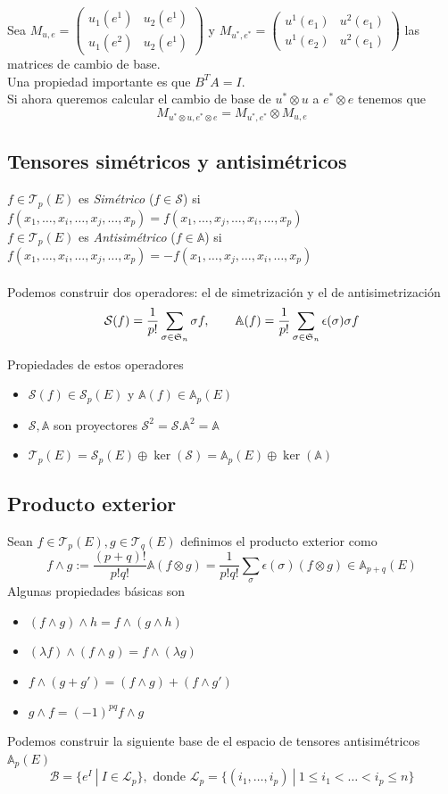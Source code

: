 \documentclass{myclass}
\newcommand{\T}{\mathcal{T}}
\newcommand{\A}{\mathcal{A}}
\renewcommand{\S}{\mathcal{S}}
\newcommand{\st}{\ | \ }
\renewcommand{\A}{\mathbb{A}}
\begin{document}
Sea $M_{u, e} = \begin{pmatrix}
u_1(e^1) & u_2(e^1) \\
u_1(e^2) & u_2(e^1)
\end{pmatrix}$ y $M_{u^*, e^*} = \begin{pmatrix}
u^1(e_1) & u^2(e_1) \\
u^1(e_2) & u^2(e_1)
\end{pmatrix}$ las matrices de cambio de base.\\
Una propiedad importante es que $B^TA = I$.
\\
Si ahora queremos calcular el cambio de base de $u^*\otimes u$ a $e^*\otimes e$ tenemos que
$$
M_{u^*\otimes u, e^*\otimes e} = M_{u^*, e^*}\otimes M_{u,e}
$$

\subsection{Tensores simétricos y antisimétricos}
$f\in\T_p(E)$ es \textit{Simétrico} ($f\in \S$) si $f(x_1, \ldots, x_i, \ldots, x_j, \ldots, x_p) = f(x_1, \ldots, x_j, \ldots, x_i, \ldots, x_p)$ \\
$f\in\T_p(E)$ es \textit{Antisimétrico} ($f\in \A$) si $f(x_1, \ldots, x_i, \ldots, x_j, \ldots, x_p) = -f(x_1, \ldots, x_j, \ldots, x_i, \ldots, x_p)$ \\
\\
Podemos construir dos operadores: el de simetrización y el de antisimetrización
$$
\S(f) = \frac{1}{p!} \sum_{\sigma \in \frak{S}_n} \sigma f, \qquad \A(f) = \frac{1}{p!} \sum_{\sigma \in \frak{S}_n} \epsilon(\sigma)\sigma f
$$

Propiedades de estos operadores
\begin{itemize}
    \item $\S(f)\in \S_p(E)$ y $\A(f)\in \A_p(E)$
    \item $\S, \A$ son proyectores $\S^2=\S. \A^2=\A$
    \item $\T_p(E)=\S_p(E)\oplus \ker(\S) = \A_p(E)\oplus \ker(\A)$
\end{itemize}

\subsection{Producto exterior}
Sean $f\in\T_p(E), g\in \T_q(E) $ definimos el producto exterior como
$$
f\wedge g := \frac{(p+q)!}{p!q!}\A(f\otimes g) = \frac{1}{p!q!}\sum_\sigma \epsilon(\sigma)(f\otimes g) \in \A_{p+q}(E)
$$
Algunas propiedades básicas son
\begin{itemize}
    \item $(f\wedge g)\wedge h=f\wedge(g\wedge h)$
    \item $(\lambda f)\wedge(f\wedge g) = f\wedge(\lambda g)$
    \item $f\wedge(g+g') = (f\wedge g) + (f\wedge g')$
    \item $g\wedge f = (-1)^{pq} f\wedge g$
\end{itemize}
Podemos construir la siguiente base de el espacio de tensores antisimétricos $\A_p(E)$
$$
\mathcal{B} = \{ e^I \st I\in \mathcal{L}_p \}, \text{ donde } \mathcal{L}_p = \{ (i_1, \dots, i_p) \st 1\leq i_1 < \ldots <i_p\leq n \}
$$
\end{document}
